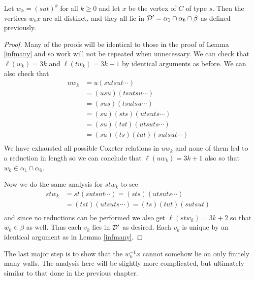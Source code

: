 \documentclass[class=book, crop=false]{standalone}
\begin{document}
\begin{lemma}
	\label{336f2infmany}
	Let $w_k=(sut)^k$ for all $k\ge 0$ and let $x$ be the vertex of $C$ of type $s.$ Then the vertices $w_kx$ are all distinct, and they all lie in $\mathcal{D}'=\alpha_1\cap \alpha_6\cap\beta$ as defined previously.
\end{lemma}
\begin{proof}
	Many of the proofs will be identical to those in the proof of Lemma \ref{infmany} and so work will not be repeated when unnecessary. We can check that $\ell(w_k)=3k$ and $\ell(tw_k)=3k+1$ by identical arguments as before. We can also check that
	\begin{align*}
		uw_k&=u(sutsut\cdots)\\
		    &=(usu)(tsutsu\cdots)\\
		    &=(sus)(tsutsu\cdots)\\
		    &=(su)(sts)(utsuts\cdots)\\
		    &=(su)(tst)(utsuts\cdots)\\
		    &=(su)(ts)(tut)(sutsut\cdots)\\
	\end{align*}
We have exhausted all possible Coxeter relations in $uw_k$ and none of them led to a reduction in length so we can conclude that $\ell(uw_k)=3k+1$ also so that $w_k\in \alpha_1\cap \alpha_6.$

Now we do the same analysis for $stw_k$ to see
\begin{align*}
	stw_k&=st(sutsut\cdots)=(sts)(utsuts\cdots)\\
	     &=(tst)(utsuts\cdots)=(ts)(tut)(sutsut)\\
\end{align*}
and since no reductions can be performed we also get $\ell(stw_k)=3k+2$ so that $w_k\in \beta$ as well. Thus each $v_k$ lies in $\mathcal{D}'$ as desired. Each $v_k$ is unique by an identical argument as in Lemma \ref{infmany}.
\end{proof}

The last major step is to show that the $w_k^{-1}x$ cannot somehow lie on only finitely many walls. The analysis here will be slightly more complicated, but ultimately similar to that done in the previous chapter.
\end{document}
